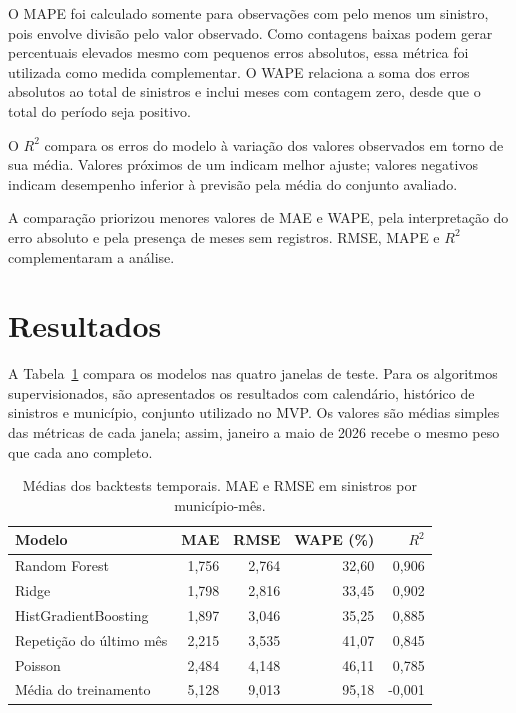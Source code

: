 \documentclass[12pt]{article}
\begin{document}
O MAPE foi calculado somente para observações com pelo menos um sinistro, pois envolve divisão pelo valor observado. Como contagens baixas podem gerar percentuais elevados mesmo com pequenos erros absolutos, essa métrica foi utilizada como medida complementar. O WAPE relaciona a soma dos erros absolutos ao total de sinistros e inclui meses com contagem zero, desde que o total do período seja positivo.

O $R^2$ compara os erros do modelo à variação dos valores observados em torno de sua média. Valores próximos de um indicam melhor ajuste; valores negativos indicam desempenho inferior à previsão pela média do conjunto avaliado.

A comparação priorizou menores valores de MAE e WAPE, pela interpretação do erro absoluto e pela presença de meses sem registros. RMSE, MAPE e $R^2$ complementaram a análise.



\section{Resultados}
\label{sec:resultados}

A Tabela~\ref{tab:modelos} compara os modelos nas quatro janelas de teste. Para os algoritmos supervisionados, são apresentados os resultados com calendário, histórico de sinistros e município, conjunto utilizado no MVP. Os valores são médias simples das métricas de cada janela; assim, janeiro a maio de 2026 recebe o mesmo peso que cada ano completo.

\begin{table}[ht]
\centering
\caption{Médias dos backtests temporais. MAE e RMSE em sinistros por município-mês.}
\label{tab:modelos}
\begin{tabular}{lrrrr}
\hline
Modelo & MAE & RMSE & WAPE (\%) & $R^2$ \\
\hline
Random Forest & 1,756 & 2,764 & 32,60 & 0,906 \\
Ridge & 1,798 & 2,816 & 33,45 & 0,902 \\
HistGradientBoosting & 1,897 & 3,046 & 35,25 & 0,885 \\
Repetição do último mês & 2,215 & 3,535 & 41,07 & 0,845 \\
Poisson & 2,484 & 4,148 & 46,11 & 0,785 \\
Média do treinamento & 5,128 & 9,013 & 95,18 & -0,001 \\
\hline
\end{tabular}
\end{table}
\end{document}
